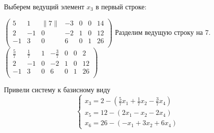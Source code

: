 \documentclass[a4paper,14pt]{extarticle}
\begin{document}
Выберем ведущий элемент $x_3$ в первый строке:\bigbreak

$\begin{pmatrix}
        5  & 1  & \|7\| & -3 & 0 & 0 & 14 \\
        2  & -1 & 0     & -2 & 1 & 0 & 12 \\
        -1 & 3  & 0     & 6  & 0 & 1 & 26 \\
    \end{pmatrix}$\bigbreak
Разделим ведущую строку на 7.\bigbreak
$\begin{pmatrix}
        \frac{5}{7} & \frac{1}{7} & 1 & -\frac{3}{7} & 0 & 0 & 2  \\
        2           & -1          & 0 & -2           & 1 & 0 & 12 \\
        -1          & 3           & 0 & 6            & 0 & 1 & 26 \\
    \end{pmatrix}$\bigbreak

Привели систему к базисному виду
\begin{equation*}
    \begin{cases}
        x_3 = 2 - (\frac{5}{7}x_1 + \frac{1}{7}x_2 -\frac{3}{7}x_4) \\
        x_5 = 12 - (2x_1 - x_2 - 2x_4)                              \\
        x_6 = 26 - (-x_1 + 3x_2 + 6x_4)
    \end{cases}
\end{equation*}\bigbreak
\end{document}

